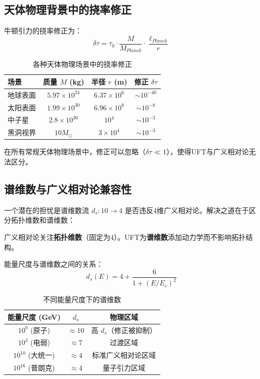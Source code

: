 \subsection{天体物理背景中的挠率修正}

牛顿引力的挠率修正为：
\begin{equation}
    \delta\tau = \tau_0 \cdot \frac{M}{M_{Planck}} \cdot \frac{\ell_{Planck}}{r}
    \label{eq:torsion_correction}
\end{equation}

\begin{table}[htbp]
\centering
\caption{各种天体物理场景中的挠率修正}
\begin{tabular}{@{}lccc@{}}
\toprule
场景 & 质量 $M$ (kg) & 半径 $r$ (m) & 修正 $\delta\tau$ \\
\midrule
地球表面 & $5.97 \times 10^{24}$ & $6.37 \times 10^6$ & $\sim 10^{-40}$ \\
太阳表面 & $1.99 \times 10^{30}$ & $6.96 \times 10^8$ & $\sim 10^{-8}$ \\
中子星 & $2.8 \times 10^{30}$ & $10^4$ & $\sim 10^{-3}$ \\
黑洞视界 & $10M_\odot$ & $3 \times 10^4$ & $\sim 10^{-3}$ \\
\bottomrule
\end{tabular}
\label{tab:torsion_corrections}
\end{table}

在所有常规天体物理场景中，修正可以忽略（$\delta\tau \ll 1$），使得UFT与广义相对论无法区分。

\subsection{谱维数与广义相对论兼容性}

一个潜在的担忧是谱维数流 $d_s: 10 \to 4$ 是否违反4维广义相对论。解决之道在于区分拓扑维数和谱维数：

\begin{proposition}[广义相对论兼容性]
广义相对论关注\textbf{拓扑维数}（固定为4）。UFT为\textbf{谱维数}添加动力学而不影响拓扑结构。
\end{proposition}

能量尺度与谱维数之间的关系：
\begin{equation}
    d_s(E) = 4 + \frac{6}{1 + (E/E_c)^2}
    \label{eq:spectral_vs_energy}
\end{equation}

\begin{table}[htbp]
\centering
\caption{不同能量尺度下的谱维数}
\begin{tabular}{@{}ccc@{}}
\toprule
能量尺度 (GeV) & $d_s$ & 物理区域 \\
\midrule
$10^0$ (原子) & $\approx 10$ & 高 $d_s$（修正被抑制） \\
$10^3$ (电弱) & $\approx 7$ & 过渡区域 \\
$10^{10}$ (大统一) & $\approx 4$ & 标准广义相对论区域 \\
$10^{16}$ (普朗克) & $\approx 4$ & 量子引力区域 \\
\bottomrule
\end{tabular}
\label{tab:spectral_energy}
\end{table}


